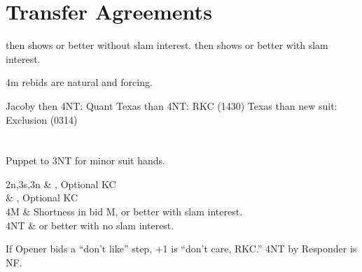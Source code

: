 \documentclass[main]{subfile}
\begin{document}
\section{Transfer Agreements}

 then  shows  or better without slam interest.
 then  shows  or better with slam interest.

4m rebids are natural and forcing.

Jacoby then 4NT:  Quant
Texas than 4NT:  RKC (1430)
Texas than new suit: Exclusion (0314)

\section[3S]{}

Puppet to 3NT for minor suit hands.

\begin{bidtable}{2n,3s,3n}
	 & \ddd, Optional KC \\
	 & \ccc, Optional KC \\
	4M & Shortness in bid M,  or better with slam interest. \\
	4NT &  or better with no slam interest. \\
\end{bidtable}

If Opener bids a ``don't like'' step, +1 is ``don't care, RKC.'' 4NT by Responder is NF.
\end{document}
